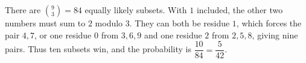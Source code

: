 There are $\binom93=84$ equally likely subsets. With $1$ included, the other two numbers must sum to $2$ modulo $3$. They can both be residue $1$, which forces the pair $4,7$, or one residue $0$ from $3,6,9$ and one residue $2$ from $2,5,8$, giving nine pairs. Thus ten subsets win, and the probability is $\boxed{\dfrac{10}{84}=\dfrac{5}{42}}$.
